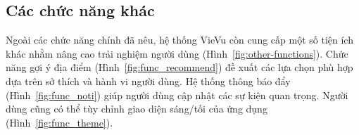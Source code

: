 \subsection{Các chức năng khác}
\noindent Ngoài các chức năng chính đã nêu, hệ thống VieVu còn cung cấp một số tiện ích khác nhằm nâng cao trải nghiệm người dùng (Hình~\ref{fig:other-functions}). Chức năng gợi ý địa điểm (Hình~\ref{fig:func_recommend}) đề xuất các lựa chọn phù hợp dựa trên sở thích và hành vi người dùng. Hệ thống thông báo đẩy (Hình~\ref{fig:func_noti}) giúp người dùng cập nhật các sự kiện quan trọng. Người dùng cũng có thể tùy chỉnh giao diện sáng/tối của ứng dụng (Hình~\ref{fig:func_theme}).

\begin{figure}[H]
    \centering
    \begin{subfigure}{0.326\textwidth}

\end{subfigure}
\end{figure}
